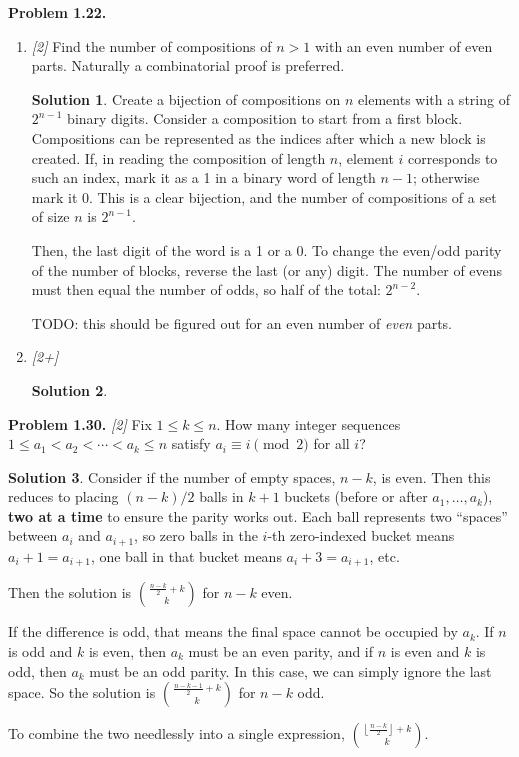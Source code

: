 \documentclass[11pt]{article}
\theoremstyle{definition}
\newtheorem*{solution}{Solution}
\newcounter{probnum}
\newcommand{\problem}[1]{%
  \setcounter{probnum}{#1}%
  \medskip
  \noindent\textbf{Problem 1.#1.}\quad
}
\begin{document}
\problem{22}
\begin{enumerate}[label=(\alph*)]
  \item \textit{[2]} Find the number of compositions of $n > 1$ with an even number
    of even parts. Naturally a combinatorial proof is preferred.
    \begin{solution}
    Create a bijection of compositions on $n$ elements with a string of $2^{n-1}$
    binary digits. Consider a composition to start from a first block. Compositions
    can be represented as the indices after which a new block is created. If, in
    reading the composition of length $n$, element $i$ corresponds to such an index,
    mark it as a 1 in a binary word of length $n-1$; otherwise mark it 0. This is a
    clear bijection, and the number of compositions of a set of size $n$ is $2^{n-1}$.

    Then, the last digit of the word is a 1 or a 0. To change the even/odd parity of
    the number of blocks, reverse the last (or any) digit. The number of evens must
    then equal the number of odds, so half of the total: $2^{n-2}$.

    TODO\@: this should be figured out for an even number of \emph{even} parts.
    \end{solution}

  \item \textit{[2+]}
    \begin{solution}
    \end{solution}
\end{enumerate}

\problem{30} \textit{[2]}
Fix $1 \leq k \leq n$. How many integer sequences $1 \leq a_1 < a_2 < \cdots < a_k
\leq n$ satisfy $a_i \equiv i \pmod{2}$ for all $i$?

\begin{solution}
Consider if the number of empty spaces, $n-k$, is even. Then this reduces to placing
$(n-k)/2$ balls in $k+1$ buckets (before or after $a_1, \ldots, a_k$), \textbf{two
at a time} to ensure the parity works out. Each ball represents two ``spaces'' between
$a_i$ and $a_{i+1}$, so zero balls in the $i$-th zero-indexed bucket means $a_i + 1 =
a_{i+1}$, one ball in that bucket means $a_i + 3 = a_{i+1}$, etc.

Then the solution is $\binom{\frac{n-k}{2} + k}{k}$ for $n-k$ even.

If the difference is odd, that means the final space cannot be occupied by $a_k$. If
$n$ is odd and $k$ is even, then $a_k$ must be an even parity, and if $n$ is even and
$k$ is odd, then $a_k$ must be an odd parity. In this case, we can simply ignore the
last space. So the solution is $\binom{\frac{n-k-1}{2} + k}{k}$ for $n-k$ odd.

To combine the two needlessly into a single expression,
$\displaystyle\binom{\left\lfloor\frac{n-k}{2}\right\rfloor + k}{k}$.
\end{solution}
\end{document}
